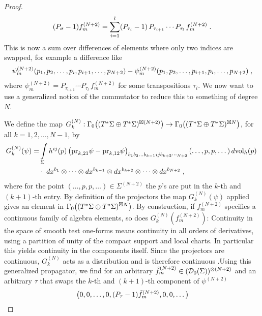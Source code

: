 \begin{proof}
\begin{align}\label{eqn:commuted-elements}
(P_\sigma - 1) f_m^{(N+2)} = \sum_{i=1}^l (P_{\tau_i} - 1)\,P_{\tau_{i+1}}\cdots P_{\tau_{l}}\,   f_m^{(N+2)} \;.
\end{align}
This is now a sum over differences of elements where only two indices are swapped, for example a difference like
\begin{align}
\psi_m^{(N+2)}(p_1,p_2,\dots,p_i,p_{i+1},\dots,p_{N+2}) - \psi_m^{(N+2)}(p_1,p_2,\dots,p_{i+1},p_{i},\dots,p_{N+2}) \;,
\end{align}
where $\psi_m^{(N+2)} = P_{\tau_{i+1}}\cdots P_{\tau_{l}}\,   f_m^{(N+2)}$ for some transpositions $\tau_i$.
We now want to use a generalized notion of the commutator to reduce this to something of degree $N$.\par
We define the map $G^{(N)}_k : \Gamma_0\big( (T^*\Sigma \oplus T^*\Sigma)^{\boxtimes (N+2)} \big) \to \Gamma_0\big( (T^*\Sigma \oplus T^*\Sigma)^{\boxtimes N} \big)$, for all $k=1,2,\dots,N-1$, by
\begin{align}
G^{(N)}_k (\psi) =& \int\limits_\Sigma h^{ij}(p) \left( \text{pr}_{k,21} \psi - \text{pr}_{k,12} \psi  \right)_{b_1 b_2 \dots b_{k-1} i j b_{k+2}\dotsb_{N+2}}(\dots,p,p,\dots)\,d\textrm{vol}_h(p) \,\notag \\
&\cdot \; dx^{b_1} \otimes \cdots \otimes  dx^{b_{k-1}}\otimes  dx^{b_{k+2}} \otimes \cdots \otimes  dx^{b_{N+2}}   \;,
\end{align}
where for the point $(\dots,p,p,\dots) \in \Sigma^{(N+2)}$ the $p$'s are put in the $k$-th and $(k+1)$-th entry. By definition of the projectors the map $G^{(N)}_k (\psi)$ applied gives an element in $\Gamma_0\big( (T^*\Sigma \oplus T^*\Sigma)^{\boxtimes N} \big)$. By construction, if $f_m^{(N+2)}$ specifies a continuous family of algebra elements, so does $G_k^{(N)}\left( f_m^{(N+2)} \right)$: Continuity in the space of smooth test one-forms means continuity in all orders of derivatives, using a partition of unity of the compact support and local charts. In particular this yields continuity in the components itself. Since the projectors are continuous, $G^{(N)}_k$ acts as a distribution and is therefore continuous .Using this generalized propagator, we find for an arbitrary $\tilde{f}_m^{(N+2)} \in (\mathcal{D}_{0}(\Sigma))^{\otimes(N+2)}$ and an arbitrary $\tau$ that swaps the $k$-th and $(k+1)$-th component of $\psi^{(N+2)}$
\begin{align}\label{eqn:inserting-commutator-zero}
	\big( 0,0,\dots,0, (P_\tau - 1)& \tilde{f}_m^{(N+2)},0,0,\dots \big) \notag \\

\end{align}
\end{proof}
